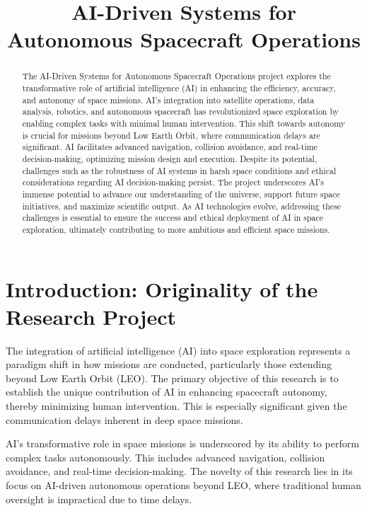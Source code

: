 \documentclass[12pt]{article}
\title{AI-Driven Systems for Autonomous Spacecraft Operations}
\author{}
\date{}
\begin{document}
\maketitle

\begin{abstract}
The AI-Driven Systems for Autonomous Spacecraft Operations project explores the transformative role of artificial intelligence (AI) in enhancing the efficiency, accuracy, and autonomy of space missions. AI's integration into satellite operations, data analysis, robotics, and autonomous spacecraft has revolutionized space exploration by enabling complex tasks with minimal human intervention. This shift towards autonomy is crucial for missions beyond Low Earth Orbit, where communication delays are significant. AI facilitates advanced navigation, collision avoidance, and real-time decision-making, optimizing mission design and execution. Despite its potential, challenges such as the robustness of AI systems in harsh space conditions and ethical considerations regarding AI decision-making persist. The project underscores AI's immense potential to advance our understanding of the universe, support future space initiatives, and maximize scientific output. As AI technologies evolve, addressing these challenges is essential to ensure the success and ethical deployment of AI in space exploration, ultimately contributing to more ambitious and efficient space missions.
\end{abstract}

\section{Introduction: Originality of the Research Project}
The integration of artificial intelligence (AI) into space exploration represents a paradigm shift in how missions are conducted, particularly those extending beyond Low Earth Orbit (LEO). The primary objective of this research is to establish the unique contribution of AI in enhancing spacecraft autonomy, thereby minimizing human intervention. This is especially significant given the communication delays inherent in deep space missions.

AI's transformative role in space missions is underscored by its ability to perform complex tasks autonomously. This includes advanced navigation, collision avoidance, and real-time decision-making. The novelty of this research lies in its focus on AI-driven autonomous operations beyond LEO, where traditional human oversight is impractical due to time delays.
\end{document}
